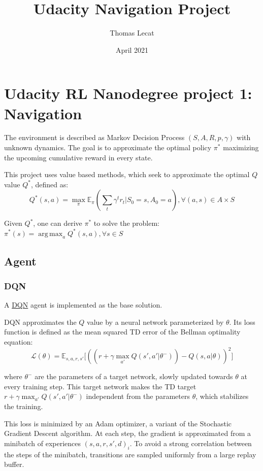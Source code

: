 \documentclass{article}
\title{Udacity Navigation Project}
\author{Thomas Lecat}
\date{April 2021}
\DeclareMathOperator*{\argmax}{arg\,max}
\begin{document}
\maketitle

\section{Udacity RL Nanodegree project 1: Navigation}

The environment is described as Markov Decision Process $(S, A, R, p, \gamma)$ with
unknown dynamics. The goal is to approximate the optimal policy $\pi^*$ maximizing
the upcoming cumulative reward in every state.

This project uses value based methods, which seek to approximate the optimal $Q$ value
$Q^*$, defined as:
$$
Q^*(s, a) = \max_{\pi} \mathbb{E}_{\pi} (\sum_{t} \gamma^t r_t | S_0=s, A_0=a),  \forall (a, s) \in A \times S
$$

Given $Q^*$, one can derive $\pi^*$ to solve the problem:
$\pi^*(s) = \argmax_a Q^*(s, a), \forall s \in S$

\subsection{Agent}

\subsubsection{DQN}


A \href{https://storage.googleapis.com/deepmind-media/dqn/DQNNaturePaper.pdf}{DQN} agent
is implemented as the base solution.

DQN approximates the $Q$ value by a neural network parameterized by $\theta$.
Its loss function is defined as the mean squared TD error of the Bellman optimality equation:
$$
\mathcal{L}(\theta) = \mathbb{E}_{s, a, r, s'} \big[((r + \gamma \max_{a'} Q(s', a' | \theta^-)) - Q(s, a | \theta))^2\big]
$$

where $\theta^-$ are the parameters of a target network, slowly updated towards $\theta$
at every training step. This target network makes the TD target
$r + \gamma \max_{a'} Q(s', a' | \theta^-)$ independent from the parameters $\theta$,
which stabilizes the training.


This loss is minimized by an Adam optimizer, a variant of the Stochastic Gradient
Descent algorithm.
At each step, the gradient is approximated from a minibatch of experiences
${(s, a, r, s', d)_i}$. To avoid a strong correlation between the steps of the
minibatch, transitions are sampled uniformly from a large replay buffer.
\end{document}
